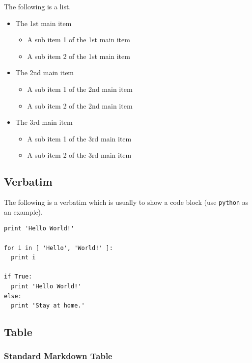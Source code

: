 \documentclass[10pt, a4paper, oneside]{article}
\providecommand{\tightlist}{%
  \setlength{\itemsep}{0pt}\setlength{\parskip}{0pt}}
\begin{document}
The following is a list.

\begin{itemize}
\tightlist
\item
  The 1st main item

  \begin{itemize}
  \tightlist
  \item
    A sub item 1 of the 1st main item
  \item
    A sub item 2 of the 1st main item
  \end{itemize}
\item
  The 2nd main item

  \begin{itemize}
  \tightlist
  \item
    A sub item 1 of the 2nd main item
  \item
    A sub item 2 of the 2nd main item
  \end{itemize}
\item
  The 3rd main item

  \begin{itemize}
  \tightlist
  \item
    A sub item 1 of the 3rd main item
  \item
    A sub item 2 of the 3rd main item
  \end{itemize}
\end{itemize}

\subsection{Verbatim}\label{verbatim}

The following is a verbatim which is usually to show a code block (use \texttt{python} as an example).

\begin{verbatim}
print 'Hello World!'

for i in [ 'Hello', 'World!' ]:
  print i

if True:
  print 'Hello World!'
else:
  print 'Stay at home.'
\end{verbatim}

\clearpage

\subsection{Table}\label{table}

\subsubsection{Standard Markdown Table}\label{standard-markdown-table}
\end{document}
